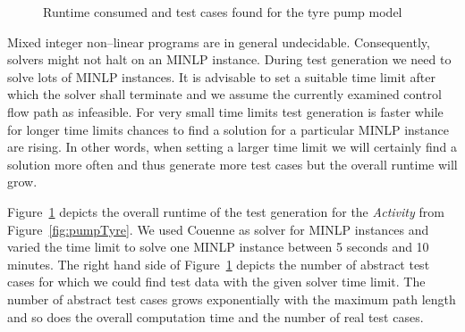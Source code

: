 \documentclass[runningheads,a4paper]{llncs}%
\newcommand{\UMLType}[1]{\textsf{\textit{#1}}} %
\begin{document}
\begin{figure}
%
\caption{Runtime consumed and test cases found for the tyre pump model%
}%
\label{fig:ExplodingTyresRuntime}%
\end{figure}%
Mixed integer non--linear programs are in general undecidable. Consequently,
solvers might not halt on an MINLP instance. During test generation we need to
solve lots of MINLP instances. It is advisable to set a suitable time limit
after which the solver shall terminate and we assume the currently examined
control flow path as infeasible. For very small time limits test generation is
faster while for longer time limits chances to find a solution for a particular
MINLP instance are rising. In other words, when setting a larger time limit we
will certainly find a solution more often and thus generate more test cases but
the overall runtime will grow.

Figure~\ref{fig:ExplodingTyresRuntime} depicts the overall runtime of the
test generation for the \UMLType{Activity} from Figure~\ref{fig:pumpTyre}. We
used Couenne as solver for MINLP instances and varied the time limit to solve
one MINLP instance between 5 seconds and 10 minutes. The right hand side of
Figure~\ref{fig:ExplodingTyresRuntime} depicts the number of abstract test
cases for which we could find test data with the given solver time
limit. The number of abstract test cases grows exponentially with the maximum
path length and so does the overall computation time and the number of real test
cases.
\end{document}
